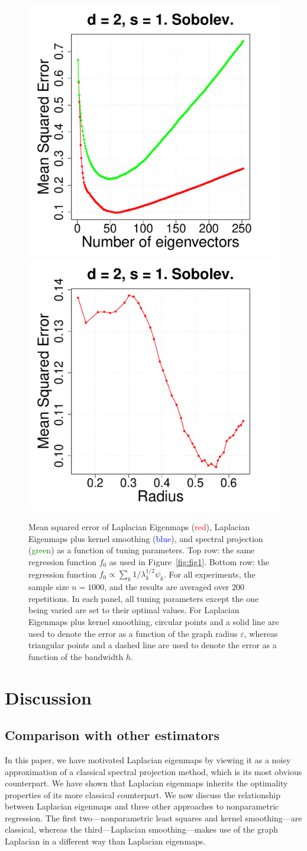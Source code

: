 \documentclass{article}
\newcommand{\1}{\mathbf{1}}
\theoremstyle{alden}
\theoremstyle{aldenthm}
\theoremstyle{definition}
\theoremstyle{remark}
\begin{document}
\begin{figure}[tb]
	\includegraphics[width=.245\textwidth]{figures/tuning/sobolev/mse_by_number_of_eigenvectors_2d_1s.pdf}
	\includegraphics[width=.245\textwidth]{figures/tuning/sobolev/mse_by_radius_2d_1s.pdf}  
	\caption{Mean squared error of Laplacian Eigenmaps (\textcolor{red}{red}), Laplacian Eigenmaps plus kernel smoothing (\textcolor{blue}{blue}), and spectral projection (\textcolor{green}{green}) as a function of tuning parameters. Top row: the same regression function $f_0$ as used in Figure~\ref{fig:fig1}. Bottom row: the regression function $f_0 \propto \sum_{k} 1/\lambda_k^{1/2} \psi_k$. For all experiments, the sample size $n = 1000$, and the results are averaged over $200$ repetitions. In each panel, all tuning parameters except the one being varied are set to their optimal values. For Laplacian Eigenmaps plus kernel smoothing, circular points and a solid line are used to denote the error as a function of the graph radius $\varepsilon$, whereas triangular points and a dashed line are used to denote the error as a function of the bandwidth $h$.}
	\label{fig:fig3}
\end{figure}

\section{Discussion}
\label{sec:discussion}

\subsection{Comparison with other estimators}
In this paper, we have motivated Laplacian eigenmaps by viewing it as a noisy approximation of a classical spectral projection method, which is its most obvious counterpart. We have shown that Laplacian eigenmaps inherits the optimality properties of its more classical counterpart. We now discuss the relationship between Laplacian eigenmaps and three other approaches to nonparametric regression. The first two---nonparametric least squares and kernel smoothing---are classical, whereas the third---Laplacian smoothing---makes use of the graph Laplacian in a different way than Laplacian eigenmaps.
\end{document}
